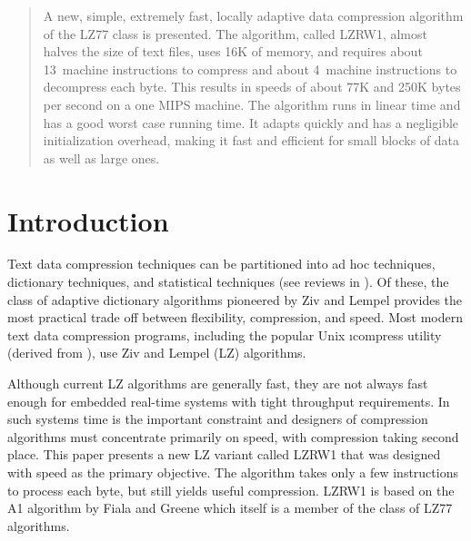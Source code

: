 \long{}

\long{}


\sloppy

\begin{abstract}
%
\noindent\normalsize A  new, simple, extremely fast,  locally adaptive
data  compression  algorithm  of  the LZ77  class  is  presented.  The
algorithm, called  LZRW1, almost halves  the size of text  files, uses
16K of memory, and requires  about 13~machine instructions to compress
and about 4~machine instructions to decompress each byte. This results
in  speeds of  about 77K  and  250K bytes  per  second on  a one  MIPS
machine. The algorithm  runs in linear time and has  a good worst case
running time.  It adapts quickly  and has a  negligible initialization
overhead, making  it fast and  efficient for  small blocks of  data as
well as large ones.
%
\end{abstract}

\section{Introduction}

Text  data  compression techniques  can  be  partitioned into  ad  hoc
techniques,  dictionary techniques,  and  statistical techniques  (see
reviews   in  ).   Of
these, the  class of adaptive  dictionary algorithms pioneered  by Ziv
and Lempel provides the most practical trade
off between flexibility, compression, and speed. Most modern text data
compression programs, including the  popular Unix \i{compress} utility
(derived from ), use Ziv and Lempel (LZ) algorithms.

Although current LZ algorithms are generally fast, they are not always
fast  enough  for embedded  real-time  systems  with tight  throughput
requirements. In  such systems  time is  the important  constraint and
designers  of compression  algorithms  must  concentrate primarily  on
speed, with compression taking second place. This paper presents a new
LZ variant  called LZRW1 that was  designed with speed as  the primary
objective. The algorithm takes only a few instructions to process each
byte, but  still yields useful compression.  LZRW1 is based on  the A1
algorithm by Fiala and Greene  which itself is a member
of the class of LZ77 algorithms.

